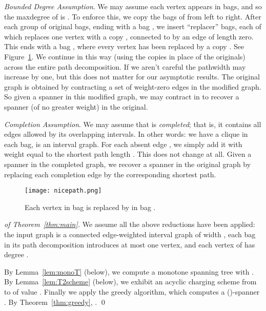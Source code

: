 \documentclass{llncs}
\begin{document}
\emph{Bounded Degree Assumption}. We may assume each vertex appears in  bags, and so the
maxdegree of  is .  To enforce this, we copy the bags of 
from left to right.  After each group of  original bags, ending
with a bag , we insert  ``replacer'' bags, each of which
replaces one vertex  with a copy , connected to 
by an edge of length zero. This ends with a bag , where every
vertex  has been replaced by a copy .
See Figure~\ref{fig:nicepath}.
We continue in this way (using the copies in place of the originals)
across the entire path decomposition.  If we aren't careful the
pathwidth may increase by one, but this does not matter for our
asymptotic results.  The original graph is obtained by contracting a
set  of weight-zero edges in the modified graph.  So given a
spanner  in this modified graph, we may contract  in 
to recover a spanner (of no greater weight) in the original.

\emph{Completion Assumption}. We may assume that  is \emph{completed}; that is, it contains
all edges allowed by its overlapping intervals.  In other words: we
have a clique in each bag,  is an interval graph.  For each absent
edge , we simply add it with weight  equal to the
shortest path length .  This does not change  at all.
Given a spanner  in the completed graph, we recover a spanner in
the original graph by replacing each completion edge by the
corresponding shortest path.

\begin{figure}[ht]
\begin{center}
{\texttt{[image: nicepath.png]}}
\caption{Each vertex  in bag  is replaced by  in bag .}
\label{fig:nicepath}
\end{center}
\end{figure}


\begin{proof}[of Theorem~\ref{thm:main}]
We assume all the above reductions have been applied: the input graph 
is a connected edge-weighted interval graph of width , each bag in its path 
decomposition introduces at most one vertex, and each vertex of  
has degree .

By Lemma~\ref{lem:monoT} (below), we compute a monotone spanning tree
 with .
By Lemma~\ref{lem:T2scheme} (below), we exhibit an acyclic charging
scheme from  to  of value .
Finally we apply the greedy algorithm, which computes
a ()-spanner .
By Theorem~\ref{thm:greedy}, .
\qed
\end{proof}
\end{document}
